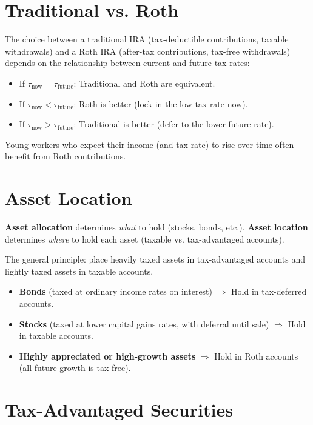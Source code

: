 \documentclass[11pt,letterpaper]{report}
\begin{document}
\section{Traditional vs. Roth}


The choice between a traditional IRA (tax-deductible contributions, taxable withdrawals) and a Roth IRA (after-tax contributions, tax-free withdrawals) depends on the relationship between current and future tax rates:

\begin{itemize}
  \item If $\tau_{\text{now}} = \tau_{\text{future}}$: Traditional and Roth are equivalent.
  \item If $\tau_{\text{now}} < \tau_{\text{future}}$: Roth is better (lock in the low tax rate now).
  \item If $\tau_{\text{now}} > \tau_{\text{future}}$: Traditional is better (defer to the lower future rate).
\end{itemize}

Young workers who expect their income (and tax rate) to rise over time often benefit from Roth contributions.

\section{Asset Location}


\textbf{Asset allocation} determines \textit{what} to hold (stocks, bonds, etc.).  \textbf{Asset location} determines \textit{where} to hold each asset (taxable vs. tax-advantaged accounts).

The general principle: place heavily taxed assets in tax-advantaged accounts and lightly taxed assets in taxable accounts.

\begin{itemize}
  \item \textbf{Bonds} (taxed at ordinary income rates on interest) $\Rightarrow$ Hold in tax-deferred accounts.
  \item \textbf{Stocks} (taxed at lower capital gains rates, with deferral until sale) $\Rightarrow$ Hold in taxable accounts.
  \item \textbf{Highly appreciated or high-growth assets} $\Rightarrow$ Hold in Roth accounts (all future growth is tax-free).
\end{itemize}

\section{Tax-Advantaged Securities}
\end{document}
